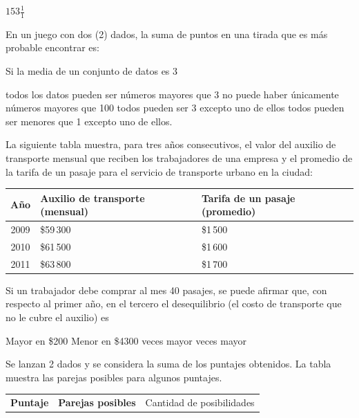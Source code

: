 \documentclass[10pt,letterpaper,addpoints]{exam}
\begin{document}
\begin{multicols}{2}
\begin{questions}
\begin{oneparchoices}
\choice $153 \frac{1}{1}$
\end{oneparchoices}
\question En un juego con dos (2) dados, la suma de puntos en una tirada que es más probable encontrar es:

\begin{oneparchoices}
\end{oneparchoices}
\question Si la media de un conjunto de datos es 3
\begin{choices}
\choice todos los datos pueden ser números mayores que 3
\CorrectChoice no puede haber únicamente números mayores que 100
\choice todos pueden ser 3 excepto uno de ellos
\choice todos pueden ser menores que 1 excepto uno de ellos.
\end{choices}
\question La siguiente tabla muestra, para tres años consecutivos, el valor del auxilio de transporte mensual que reciben los trabajadores de una empresa y el promedio de la tarifa de un pasaje para el servicio de transporte urbano en la ciudad:
\begin{center}
\begin{tabular}{|c|p{3cm}|p{3cm}|}
\hline 
\textbf{Año} & \textbf{Auxilio de transporte} (mensual) & \textbf{Tarifa de un pasaje} (promedio)\\ 
\hline 
2009 & \quad \$59\,300 & \quad \$1\,500 \\ 
\hline 
2010 & \quad \$61\,500 & \quad \$1\,600 \\ 
\hline 
2011 & \quad \$63\,800 & \quad \$1\,700 \\ 
\hline 
\end{tabular} 
\end{center}
Si un trabajador debe comprar al mes 40 pasajes, se puede afirmar que, con respecto al primer año, en el tercero el desequilibrio (el costo de transporte que no le cubre el auxilio) es
\begin{choices}
\choice Mayor en \$200
\choice Menor en \$4300
 veces mayor
 veces mayor
\end{choices}
\question Se lanzan 2 dados y se considera la suma de los puntajes obtenidos. La tabla muestra las parejas posibles para algunos puntajes.
\begin{center}
\begin{tabular}{|p{.4cm}|p{3.9cm}|p{2cm}|}
\hline 
\textbf{Puntaje} & \textbf{Parejas posibles} & Cantidad de posibilidades\\ 

\end{tabular}
\end{center}
\end{questions}
\end{multicols}
\end{document}
